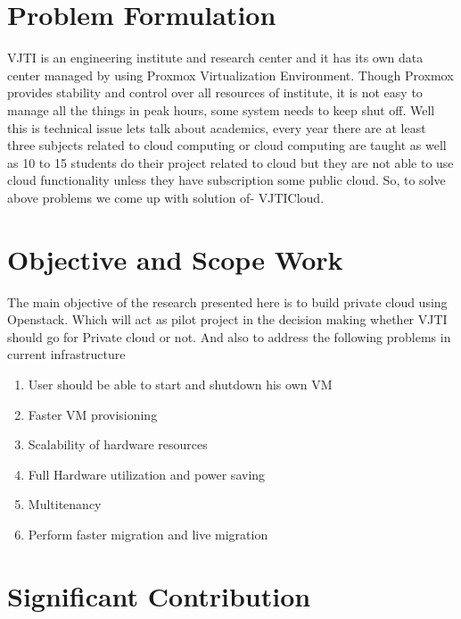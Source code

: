 \section{Problem Formulation}
 \par
 
 \par VJTI is an engineering institute and research center and it has its own data center managed by using Proxmox Virtualization Environment. Though Proxmox provides stability and control over all resources of institute, it is not easy to manage all the things in peak hours, some system needs to keep shut off. Well this is technical issue lets talk about academics, every year there are at least three subjects related to cloud computing or cloud computing are taught as well as 10 to 15 students do their project related to cloud but they are not able to use cloud functionality unless they have subscription some public cloud. So, to solve above problems we come up with solution of- VJTICloud.

\section{Objective and Scope Work}

The main objective of the research presented here is to build private cloud using Openstack\cite{openstack}. Which will act as pilot project in the decision making whether VJTI should go for Private cloud or not. And also to address the following problems in current infrastructure 

\begin{enumerate}
  \item User should be able to start and shutdown his own VM
  \item Faster VM provisioning
  \item Scalability of hardware resources
  \item Full Hardware utilization and power saving %
  \item Multitenancy %
  \item Perform faster migration and live migration %
\end{enumerate}


\section{Significant Contribution}


